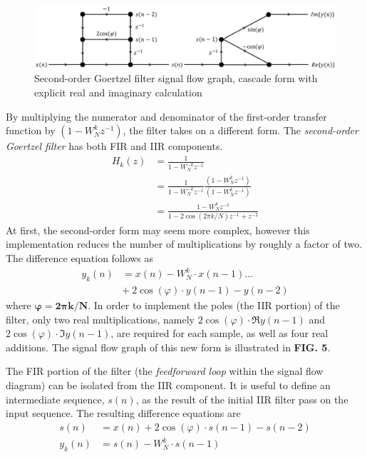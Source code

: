 \documentclass[reprint,amsmath,amssymb]{revtex4-2}
\begin{document}
\begin{figure}
    \centering
    \includegraphics[width=\linewidth]{figs/goertzel_cascade.png}
    \caption{Second-order Goertzel filter signal flow graph, cascade form with explicit real and imaginary calculation}
    \label{fig:6}
\end{figure}

By multiplying the numerator and denominator of the first-order transfer function by $(1-W_N^kz^{-1})$, the filter takes on a different form. The \textit{second-order Goertzel filter} has both FIR and IIR components.
\begin{align}
    H_k(z) & = \frac{1}{1-W_N^{-k}z^{-1}} \nonumber \\
           & = \frac{1}{1-W_N^{-k}z^{-1}} \frac{(1-W_N^kz^{-1})}{(1-W_N^kz^{-1})} \nonumber \\
           & = \frac{1-W_N^kz^{-1}}{1-2\cos(2\pi k/N)z^{-1} + z^{-2}}
\end{align}
At first, the second-order form may seem more complex, however this implementation reduces the number of multiplications by roughly a factor of two. The difference equation follows as
\begin{align}
    y_k(n) & = x(n) - W_N^k\cdot x(n-1) \ldots \nonumber \\ & +\ 2\cos(\varphi)\cdot y(n-1) - y(n-2)
\end{align}
where $\bm{\varphi = 2\pi k/N}$. In order to implement the poles (the IIR portion) of the filter, only two real multiplications, namely $2\cos(\varphi)\cdot \Re{y(n-1)}$ and $2\cos(\varphi)\cdot \Im{y(n-1)}$, are required for each sample, as well as four real additions. The signal flow graph of this new form is illustrated in \textbf{FIG. 5}.

The FIR portion of the filter (the \textit{feedforward loop} within the signal flow diagram) can be isolated from the IIR component. It is useful to define an intermediate sequence, $s(n)$, as the result of the initial IIR filter pass on the input sequence. The resulting difference equations are
\begin{align}
    s(n) & = x(n) + 2\cos(\varphi)\cdot s(n-1) - s(n-2) \\
    y_k(n) & = s(n) - W_N^k\cdot s(n-1)
\end{align}
\end{document}
